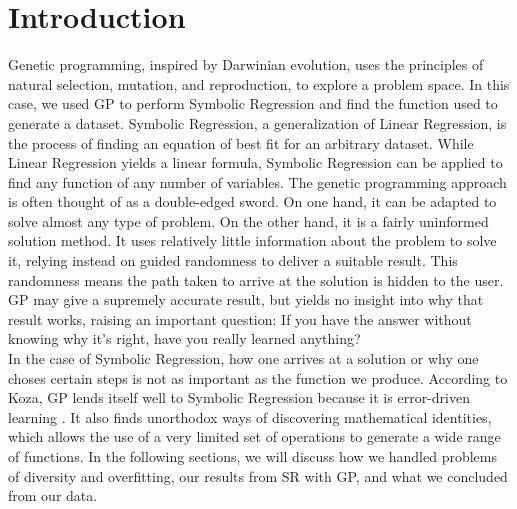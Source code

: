 
\section{Introduction}
\label{sec:intro}

Genetic programming, inspired by Darwinian evolution, uses the principles of natural selection, mutation, and reproduction, to explore a problem space. In this case, we used GP to perform Symbolic Regression and find the function used to generate a dataset. Symbolic Regression, a generalization of Linear Regression, is the process of finding an equation of best fit for an arbitrary dataset. While Linear Regression yields a linear formula, Symbolic Regression can be applied to find any function of any number of variables. The genetic programming approach is often thought of as a double-edged sword. On one hand, it can be adapted to solve almost any type of problem. On the other hand, it is a fairly uninformed solution method. It uses relatively little information about the problem to solve it, relying instead on guided randomness to deliver a suitable result. This randomness means the path taken to arrive at the solution is hidden to the user. GP may give a supremely accurate result, but yields no insight into why that result works, raising an important question: If you have the answer without knowing why it's right, have you really learned anything? \\
In the case of Symbolic Regression, how one arrives at a solution or why one choses certain steps is not as important as the function we produce. According to Koza, GP lends itself well to Symbolic Regression because it is error-driven learning \cite{Koza97geneticprogramming}.  It also finds unorthodox ways of discovering mathematical identities, which allows the use of a very limited set of operations to generate a wide range of functions.
In the following sections, we will discuss how we handled problems of diversity and overfitting, our results from SR with GP, and what we concluded from our data.\\



